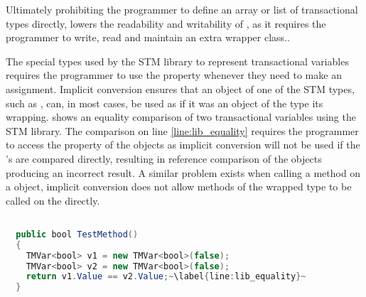 Ultimately prohibiting the programmer to define an array or list of transactional types directly, lowers the readability and writability of \stmname, as it requires the programmer to write, read and maintain an extra wrapper class.. 

The special types used by the \ac{STM} library to represent transactional variables requires the programmer to use the  property whenever they need to make an assignment. Implicit conversion ensures that an object of one of the \ac{STM} types, such as , can, in most cases, be used as if it was an object of the type its wrapping.  shows an equality comparison of two transactional variables using the \ac{STM} library. The comparison on line \ref{line:lib_equality} requires the programmer to access the  property of the  objects as implicit conversion will not be used if the 's are compared directly, resulting in reference comparison of the  objects producing an incorrect result. A similar problem exists when calling a method on a  object, implicit conversion does not allow methods of the wrapped type to be called on the  directly. 

\begin{lstlisting}[float, label=lst:lib_implicit_conversion,
  caption={Equality comparison of \bscode{TMVar<bool>}},
  language=Java,  
  showspaces=false,
  showtabs=false,
  breaklines=true,
  showstringspaces=false,
  breakatwhitespace=true,
  escapechar=~,
  commentstyle=\color{greencomments},
  keywordstyle=\color{bluekeywords},
  stringstyle=\color{redstrings},
  morekeywords={atomic, retry, orelse, var, get, set, ref, out, bool}]  % Start your code-block

  public bool TestMethod()
  {
    TMVar<bool> v1 = new TMVar<bool>(false);
    TMVar<bool> v2 = new TMVar<bool>(false);
    return v1.Value == v2.Value;~\label{line:lib_equality}~
  }
\end{lstlisting}

